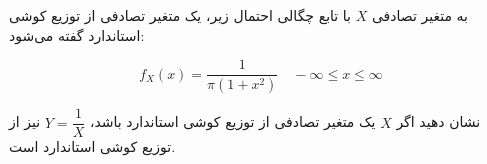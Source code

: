 \problem{}
به متغیر تصادفی \( X \) با تابع چگالی احتمال زیر، یک متغیر تصادفی از
 توزیع کوشی استاندارد گفته می‌شود:

\[
f_X(x) = \dfrac{1}{\pi (1 + x^2)} \quad -\infty \leq x \leq \infty
\]

نشان دهید اگر \( X \) یک متغیر تصادفی از توزیع کوشی 
استاندارد باشد، \( Y = \dfrac{1}{X} \) نیز از توزیع کوشی استاندارد است.
